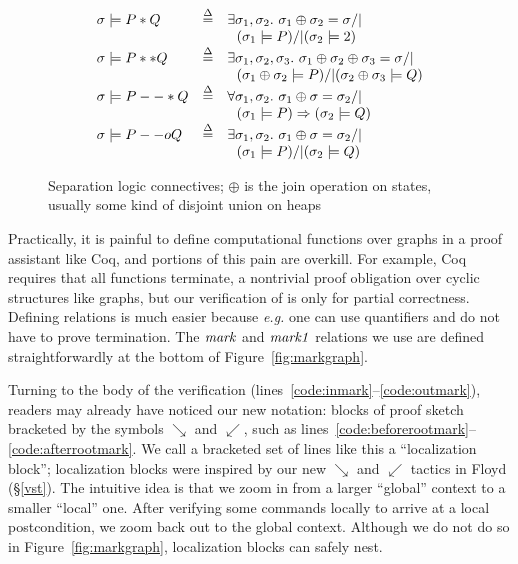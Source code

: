 \begin{figure}
\[
\begin{array}{lcl}
\sigma |= P * Q & \defeq & \exists \sigma_1, \sigma_2.~ \sigma_1 \oplus \sigma_2 = \sigma /| \null \\ && ~~ (\sigma_1 |= P) /| (\sigma_2 |= 2)\\
\sigma |= P ** Q & \defeq & \exists \sigma_1, \sigma_2, \sigma_3.~ \sigma_1 \oplus \sigma_2 \oplus \sigma_3 = \sigma /| \null \\ && ~~ (\sigma_1 \oplus \sigma_2 |= P) /| (\sigma_2 \oplus \sigma_3 |= Q) \\
\sigma |= P --* Q & \defeq & \forall \sigma_1, \sigma_2.~ \sigma_1 \oplus \sigma = \sigma_2 /| \null \\ && ~~
(\sigma_1 |= P) => (\sigma_2 |= Q) \\
\sigma |= P --o Q & \defeq & \exists \sigma_1, \sigma_2.~ \sigma_1 \oplus \sigma = \sigma_2 /| \null \\ && ~~
(\sigma_1 |= P) /| (\sigma_2 |= Q)
\end{array}
\]
\vspace{-2ex}
\caption{Separation logic connectives; $\oplus$ is the join operation on states, usually some kind of disjoint union on heaps}
\label{fig:seplogsem}
\vspace{-2ex}
\end{figure}

Practically, it is painful to define computational functions over graphs in a proof assistant like Coq, and portions of this pain are overkill.  For example, Coq requires that all functions terminate, a nontrivial proof obligation over cyclic structures like graphs, but our verification of  is only for partial correctness.  Defining relations is much easier because \emph{e.g.} one can use quantifiers and do not have to prove termination.
The $\mathit{mark}$ and $\mathit{mark1}$ relations we use are defined straightforwardly at the bottom of Figure~\ref{fig:markgraph}.

Turning to the body of the verification (lines~\ref{code:inmark}--\ref{code:outmark}), readers may already have noticed our new notation: blocks of proof sketch bracketed by the symbols $\searrow$ and $\swarrow$, such as lines~\ref{code:beforerootmark}--\ref{code:afterrootmark}.  We call a bracketed set of lines like this a ``localization block''; localization blocks were inspired by our new  $\searrow$ and  $\swarrow$ tactics in Floyd (\S\ref{vst}).
The intuitive idea is that we zoom in from a larger ``global'' context to a smaller ``local'' one.  After verifying some commands locally to arrive at a local postcondition, we zoom back out to the global context.  Although we do not do so in Figure~\ref{fig:markgraph}, localization blocks can safely nest.

